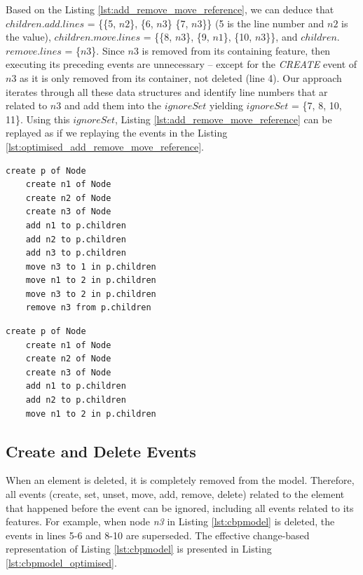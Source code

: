 \documentclass{llncs}
\begin{document}
Based on the Listing \ref{lst:add_remove_move_reference}, we can deduce that $children$.$add$.$lines$ = \{\{5, $n2$\}, \{6, $n3$\} \{7, $n3$\}\} (5 is the line number and $n2$ is the value), $children$.$move$.$lines$ = \{\{8, $n3$\}, \{9, $n1$\}, \{10, $n3$\}\}, and $children$.$remove$.$lines$ = \{$n$3\}. Since $n3$ is removed from its containing feature, then executing its preceding events are unnecessary -- except for the \textit{CREATE} event of $n3$ as it is only removed from its container, not deleted (line 4). Our approach iterates through all these data structures and identify line numbers that ar related to $n3$ and add them into the $ignoreSet$ yielding $ignoreSet$ = \{7, 8, 10, 11\}. Using this $ignoreSet$, Listing \ref{lst:add_remove_move_reference} can be replayed as if we replaying the events in the Listing \ref{lst:optimised_add_remove_move_reference}. 

\noindent
\begin{minipage}[t]{0.48\linewidth}
    \begin{lstlisting}[style=eol,caption={Example of CBP representation of attribute \emph{values}'s add, move, and remove operations.},label=lst:add_remove_move_reference]
    create p of Node
    create n1 of Node
    create n2 of Node
    create n3 of Node
    add n1 to p.children        
    add n2 to p.children        
    add n3 to p.children        
    move n3 to 1 in p.children  
    move n1 to 2 in p.children  
    move n3 to 2 in p.children
    remove n3 from p.children   
    \end{lstlisting}
\end{minipage}
\hfill
\begin{minipage}[t]{0.48\linewidth}
    \begin{lstlisting}[style=eol,caption={The optimised CBP representation of Listing \ref{lst:add_remove_move_reference}},label=lst:optimised_add_remove_move_reference]
    create p of Node
    create n1 of Node
    create n2 of Node
    create n3 of Node
    add n1 to p.children        
    add n2 to p.children  
    move n1 to 2 in p.children
    \end{lstlisting}
\end{minipage}


\subsection{Create and Delete Events}
\label{subsec:create_and_delete_operations}
When an element is deleted, it is completely removed from the model. Therefore, all events (create, set, unset, move, add, remove, delete) related to the element that happened before the event can be ignored, including all events related to its features. For example, when node \emph{n3} in Listing \ref{lst:cbpmodel} is deleted, the events in lines 5-6 and 8-10 are superseded. The effective change-based representation of Listing \ref{lst:cbpmodel} is presented in Listing \ref{lst:cbpmodel_optimised}.
\end{document}
